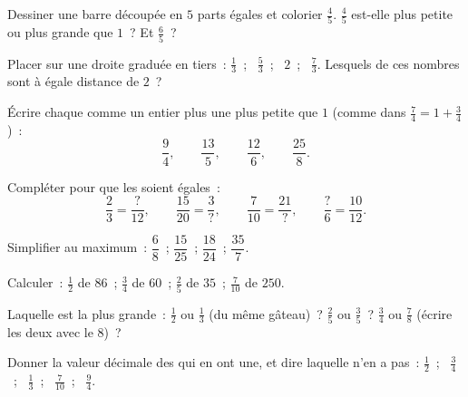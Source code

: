 \begin{exercise}[$\star$]\label{exo:g6:fractions:2}
Dessiner une barre découpée en $5$ parts égales et colorier $\frac45$.
$\frac45$ est-elle plus petite ou plus grande que $1$~? Et
$\frac65$~?
\end{exercise}

\begin{exercise}[$\star$]\label{exo:g6:fractions:3}
Placer sur une droite graduée en tiers~: $\frac13$~; \ $\frac53$~;
\ $2$~; \ $\frac73$. Lesquels de ces nombres sont à égale distance de
$2$~?
\end{exercise}

\begin{exercise}[$\star$]\label{exo:g6:fractions:4}
Écrire chaque  comme un entier plus une  plus petite
que $1$ (comme dans $\frac74 = 1 + \frac34$)~:
\[
\frac{9}{4}, \qquad \frac{13}{5}, \qquad \frac{12}{6}, \qquad
\frac{25}{8} .
\]
\end{exercise}

\begin{exercise}[$\star$]\label{exo:g6:fractions:5}
Compléter pour que les  soient égales~:
\[
\frac{2}{3} = \frac{?}{12}, \qquad
\frac{15}{20} = \frac{3}{?}, \qquad
\frac{7}{10} = \frac{21}{?}, \qquad
\frac{?}{6} = \frac{10}{12}.
\]
\end{exercise}

\begin{exercise}[$\star$]\label{exo:g6:fractions:6}
Simplifier au maximum~: $\dfrac{6}{8}$~; \quad $\dfrac{15}{25}$~;
\quad $\dfrac{18}{24}$~; \quad $\dfrac{35}{7}$.
\end{exercise}

\begin{exercise}[$\star$]\label{exo:g6:fractions:7}
Calculer~: $\frac12$ de $86$~; \quad $\frac34$ de $60$~; \quad
$\frac25$ de $35$~; \quad $\frac{7}{10}$ de $250$.
\end{exercise}

\begin{exercise}[$\star$]\label{exo:g6:fractions:8}
Laquelle est la plus grande~: $\frac12$ ou $\frac13$ (du même
gâteau)~? $\frac25$ ou $\frac35$~? $\frac34$ ou $\frac78$ (écrire
les deux avec le  $8$)~?
\end{exercise}

\begin{exercise}[$\star\star$]\label{exo:g6:fractions:9}
Donner la valeur décimale des  qui en ont une, et dire
laquelle n'en a pas~: $\frac12$~; \ $\frac34$~; \ $\frac13$~; \
$\frac{7}{10}$~; \ $\frac{9}{4}$.
\end{exercise}

